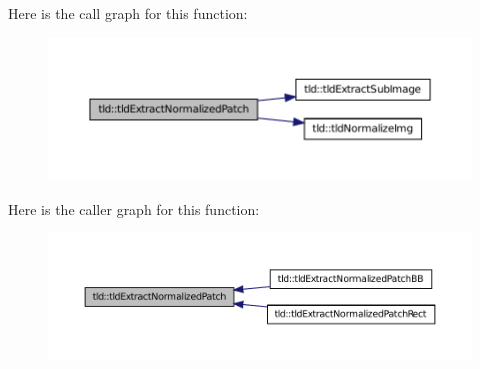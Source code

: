 Here is the call graph for this function:
\nopagebreak
\begin{figure}[H]
\begin{center}
\leavevmode
\includegraphics[width=400pt]{namespacetld_a1bf69e140ab91bdd7bfc794a93a1a096_cgraph}
\end{center}
\end{figure}




Here is the caller graph for this function:
\nopagebreak
\begin{figure}[H]
\begin{center}
\leavevmode
\includegraphics[width=400pt]{namespacetld_a1bf69e140ab91bdd7bfc794a93a1a096_icgraph}
\end{center}
\end{figure}



